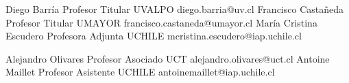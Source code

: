 





\begin{referees}
		{Diego Barría}
		{Profesor Titular}
		{UVALPO}
		{diego.barria@uv.cl}
		{Francisco Castañeda}
		{Profesor Titular}
		{UMAYOR}
		{francisco.castaneda@umayor.cl}
		{María Cristina Escudero}
		{Profesora Adjunta}
		{UCHILE}
		{mcristina.escudero@iap.uchile.cl}
\end{referees}

\begin{referees}
		{Alejandro Olivares}
		{Profesor Asociado}
		{UCT}
		{alejandro.olivares@uct.cl}
		{Antoine Maillet}
		{Profesor Asistente}
		{UCHILE}
		{antoinemaillet@iap.uchile.cl}
\end{referees}
